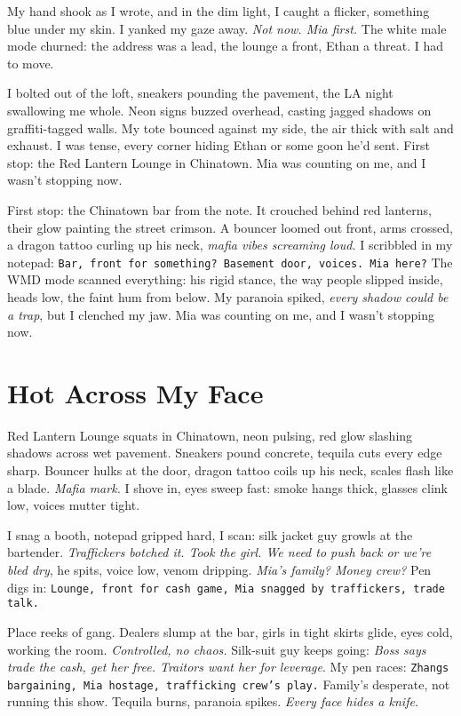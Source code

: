 \documentclass[12pt,oneside]{book} %
\newcommand{\note}[1]{\texttt{#1}}
\begin{document}
My hand shook as I wrote, and in the dim light, I caught a flicker, something blue under my skin. I yanked my gaze away. \textit{Not now. Mia first.} The white male mode churned: the address was a lead, the lounge a front, Ethan a threat. I had to move.

I bolted out of the loft, sneakers pounding the pavement, the LA night swallowing me whole. Neon signs buzzed overhead, casting jagged shadows on graffiti-tagged walls. My tote bounced against my side, the air thick with salt and exhaust. I was tense, every corner hiding Ethan or some goon he’d sent. First stop: the Red Lantern Lounge in Chinatown. Mia was counting on me, and I wasn’t stopping now.

First stop: the Chinatown bar from the note. It crouched behind red lanterns, their glow painting the street crimson. A bouncer loomed out front, arms crossed, a dragon tattoo curling up his neck, \textit{mafia vibes screaming loud.} I scribbled in my notepad: \note{Bar, front for something? Basement door, voices. Mia here?} The WMD mode scanned everything: his rigid stance, the way people slipped inside, heads low, the faint hum from below. My paranoia spiked, \textit{every shadow could be a trap}, but I clenched my jaw. Mia was counting on me, and I wasn’t stopping now.

\chapter{Hot Across My Face}

Red Lantern Lounge squats in Chinatown, neon pulsing, red glow slashing shadows across wet pavement. Sneakers pound concrete, tequila cuts every edge sharp. Bouncer hulks at the door, dragon tattoo coils up his neck, scales flash like a blade. \textit{Mafia mark.} I shove in, eyes sweep fast: smoke hangs thick, glasses clink low, voices mutter tight.

I snag a booth, notepad gripped hard, I scan: silk jacket guy growls at the bartender. \textit{Traffickers botched it. Took the girl. We need to push back or we’re bled dry}, he spits, voice low, venom dripping. \textit{Mia’s family? Money crew?} Pen digs in: \note{Lounge, front for cash game, Mia snagged by traffickers, trade talk.}

Place reeks of gang. Dealers slump at the bar, girls in tight skirts glide, eyes cold, working the room. \textit{Controlled, no chaos.} Silk-suit guy keeps going: \textit{Boss says trade the cash, get her free. Traitors want her for leverage}. My pen races: \note{Zhangs bargaining, Mia hostage, trafficking crew’s play.} Family’s desperate, not running this show. Tequila burns, paranoia spikes. \textit{Every face hides a knife.}
\end{document}
